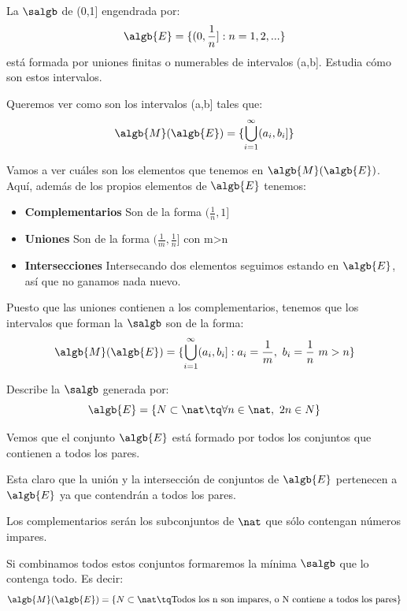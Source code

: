\begin{problem}[8]
La $\salgb$ de (0,1] engendrada por:
\[\algb{E}= \{(0, \frac{1}{n}]: n=1,2,...\}\]
está formada por uniones finitas o numerables de intervalos (a,b]. Estudia cómo son estos intervalos.

\solution
Queremos ver como son los intervalos (a,b] tales que:
\[\algb{M}(\algb{E})=\{\bigcup_{i=1}^{\infty}(a_i, b_i]\}\]

Vamos a ver cuáles son los elementos que tenemos en $\algb{M}(\algb{E})$. Aquí, además de los propios elementos de $\algb{E}$ tenemos:
\begin{itemize}
\item \textbf{Complementarios} Son de la forma $(\frac{1}{n}, 1]$

\item \textbf{Uniones} Son de la forma $(\frac{1}{m}, \frac{1}{n}]$ con m>n

\item \textbf{Intersecciones} Intersecando dos elementos seguimos estando en $\algb{E}$, así que no ganamos nada nuevo.
\end{itemize}

Puesto que las uniones contienen a los complementarios, tenemos que los intervalos que forman la $\salgb$ son de la forma:
\[\algb{M}(\algb{E})=\{\bigcup_{i=1}^{\infty}(a_i, b_i]: a_i =\frac{1}{m}, \ b_i = \frac{1}{n} \ m>n\}\]
\end{problem}

\begin{problem}[9]
Describe la $\salgb$ generada por:
\[\algb{E}= \{N \subset \nat \tq \forall n \in \nat, \ 2n \in N\}\]

\solution
Vemos que el conjunto $\algb{E}$ está formado por todos los conjuntos que contienen a todos los pares.

Esta claro que la unión y la intersección de conjuntos de $\algb{E}$ pertenecen a $\algb{E}$ ya que contendrán a todos los pares.

Los complementarios serán los subconjuntos de $\nat$ que sólo contengan números impares.

Si combinamos todos estos conjuntos formaremos la mínima $\salgb$ que lo contenga todo. Es decir:
\[\algb{M}(\algb{E})=\{N \subset \nat \tq \text{Todos los n son impares, o N contiene a todos los pares}\}\]
\end{problem}

